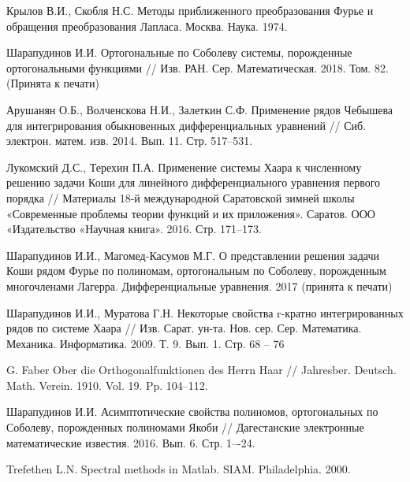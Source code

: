 \begin{thebibliography}{99}
{Крылов В.И., Скобля Н.С.}
Методы приближенного преобразования Фурье и обращения преобразования Лапласа. Москва. Наука. 1974.



Шарапудинов И.И. Ортогональные  по Соболеву системы, порожденные ортогональными функциями // Изв. РАН. Сер. Математическая. 2018. Том. 82. (Принята к печати)



{Арушанян О.Б., Волченскова Н.И., Залеткин С.Ф.}
Применение рядов Чебышева для интегрирования обыкновенных дифференциальных уравнений // Сиб. электрон. матем. изв. 2014. Вып. 11. Стр. 517--531.



{Лукомский Д.С., Терехин П.А.}
Применение системы Хаара к численному решению задачи Коши для линейного дифференциального уравнения первого порядка // Материалы 18-й международной Саратовской зимней школы «Современные проблемы теории функций и их приложения». Саратов. ООО «Издательство «Научная книга». 2016. Стр. 171--173.



{Шарапудинов И.И., Магомед-Касумов М.Г.}
О представлении решения задачи Коши  рядом Фурье  по полиномам, ортогональным по  Соболеву, порожденным многочленами Лагерра. Дифференциальные уравнения. 2017 (принята к печати)



{Шарапудинов И.И., Муратова Г.Н.}
Некоторые свойства r-кратно интегрированных рядов по системе Хаара // Изв. Сарат. ун-та. Нов. сер. Сер. Математика. Механика. Информатика. 2009. Т. 9. Вып. 1. Стр. 68 -- 76



{G. Faber}
Ober die Orthogonalfunktionen des Herrn Haar // Jahresber. Deutsch. Math. Verein. 1910. Vol. 19. Pp. 104--112.



{Шарапудинов И.И.}
Асимптотические свойства полиномов, ортогональных по Соболеву, порожденных полиномами Якоби // Дагестанские электронные математические известия. 2016. Вып. 6.	Стр. 1–-24.



{Trefethen L.N.}
Spectral methods in Matlab. SIAM. Philadelphia. 2000.




\end{thebibliography}
